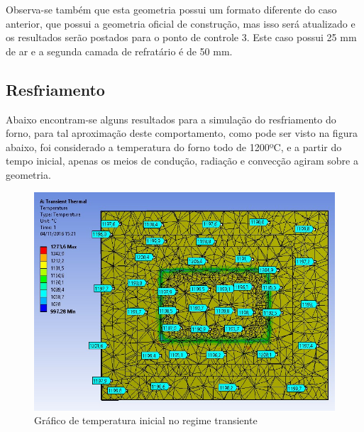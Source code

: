 Observa-se também que esta geometria possui um formato diferente do caso
anterior, que possui a geometria oficial de construção, mas isso será atualizado e os
resultados serão postados para o ponto de controle 3. Este caso possui 25 mm de ar e a
segunda camada de refratário é de 50 mm.

\subsection{Resfriamento}
Abaixo encontram-se alguns resultados para a simulação do resfriamento do forno,
para tal aproximação deste comportamento, como pode ser visto na figura abaixo, foi
considerado a temperatura do forno todo de 1200ºC, e a partir do tempo inicial, apenas os
meios de condução, radiação e convecção agiram sobre a geometria.
\begin{figure}[ht]
	\centering
	\label{ansys12}
	\includegraphics[keepaspectratio=true,scale=0.8]{figuras/ansys12.jpg}
    \caption{Gráfico de temperatura inicial no regime transiente}
\end{figure}

